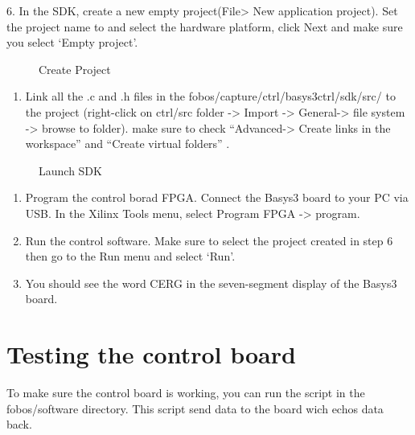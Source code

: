 \documentclass[letterpaper,10pt,english]{sphinxmanual}
\begin{document}
6. In the SDK, create a new empty project(File\textgreater{} New application project). Set the project name to  and select
the hardware platform, click Next and make sure you select ‘Empty project’.

\begin{figure}[htbp]
\centering
\capstart

\noindent{}
\caption{Create Project}\label{\detokenize{setup:id4}}\end{figure}
\begin{enumerate}
\def\theenumi{\arabic{enumi}}
\def\labelenumi{\theenumi .}
\makeatletter\def\p@enumii{\p@enumi \theenumi .}\makeatother
\setcounter{enumi}{6}
\item {} 
Link all the .c and .h files in the fobos/capture/ctrl/basys3ctrl/sdk/src/ to the project
(right-click on ctrl/src folder -\textgreater{} Import -\textgreater{} General-\textgreater{} file system -\textgreater{} browse to folder).
make sure to check “Advanced-\textgreater{} Create links in the workspace” and “Create virtual folders” .

\end{enumerate}

\begin{figure}[htbp]
\centering
\capstart

\noindent{}
\caption{Launch SDK}\label{\detokenize{setup:id5}}\end{figure}
\begin{enumerate}
\def\theenumi{\arabic{enumi}}
\def\labelenumi{\theenumi .}
\makeatletter\def\p@enumii{\p@enumi \theenumi .}\makeatother
\setcounter{enumi}{7}
\item {} 
Program the control borad FPGA. Connect the Basys3 board to your PC via USB. In the Xilinx Tools menu, select Program FPGA -\textgreater{} program.

\item {} 
Run the control software. Make sure to select the  project created in step 6 then go to the Run menu and select ‘Run’.

\item {} 
You should see the word CERG in the seven-segment display of the Basys3 board.

\end{enumerate}


\section{Testing the control board}
\label{\detokenize{setup:testing-the-control-board}}
To make sure the control board is working, you can run the  script in the fobos/software directory.
This script send data to the board wich echos data back.
\end{document}

